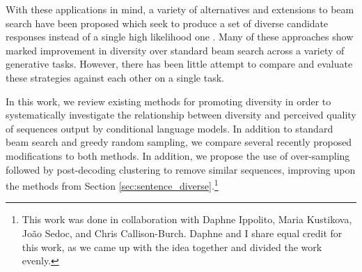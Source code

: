 With these applications in mind, a variety of alternatives and extensions to beam search have been proposed which seek to produce a set of diverse candidate responses instead of a single high likelihood one \citep{li2016diversity,vijayakumar2016diverse,kulikov2018importance,tam2019clustered}. Many of these approaches show marked improvement in diversity over standard beam search across a variety of generative tasks. However, there has been little attempt to compare and evaluate these strategies against each other on a single task.

In this work, we review existing methods for promoting diversity in order to systematically investigate the relationship between diversity and perceived quality of sequences output by conditional language models. In addition to standard beam search and greedy random sampling, we compare several recently proposed modifications to both methods. In addition, we propose the use of over-sampling followed by post-decoding clustering to remove similar sequences, improving upon the methods from Section \ref{sec:sentence_diverse}.\footnote{This work was done in collaboration with Daphne Ippolito, Maria Kustikova, Jo\~ao Sedoc, and Chris Callison-Burch. Daphne and I share equal credit for this work, as we came up with the idea together and divided the work evenly.}